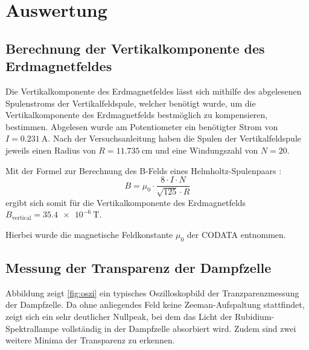 \section{Auswertung}
\label{sec:Auswertung}
\subsection{Berechnung der Vertikalkomponente des Erdmagnetfeldes}
Die Vertikalkomponente des Erdmagnetfeldes lässt sich mithilfe des abgelesenen Spulenstroms der Vertikalfeldspule, welcher benötigt wurde, um die Vertikalkomponente des Erdmagnetfelds bestmöglich zu kompensieren, bestimmen.
Abgelesen wurde am Potentiometer ein benötigter Strom von $I=\SI{0.231}{\ampere}$.
Nach der Versuchsanleitung \cite{Anleitung} haben die Spulen der Vertikalfeldspule jeweils einen Radius von $R=\SI{11.735}{\centi\meter}$ und eine Windungszahl von $N=20$.

Mit der Formel zur Berechnung des B-Felds eines Helmholtz-Spulenpaars \cite{demtröder}:
\begin{equation}
\label{eqn:hholtz}
B=\mu_{\mathrm{0}} \cdot \frac{8\cdot I \cdot N}{\sqrt{125}\cdot R}
\end{equation}
ergibt sich somit für die Vertikalkomponente des Erdmagnetfelds $B_{\mathrm{vertical}}=\SI{35.4e-6}{\tesla}$.

Hierbei wurde die magnetische Feldkonstante $\mu_{0}$ der CODATA entnommen. \cite{mu_0}
\subsection{Messung der Transparenz der Dampfzelle}
Abbildung zeigt \ref{fig:oszi} ein typisches Oszilloskopbild der Tranzparenzmessung der Dampfzelle.
Da ohne anliegendes Feld keine Zeeman-Aufspaltung stattfindet, zeigt sich ein sehr deutlicher Nullpeak, bei dem das Licht der Rubidium-Spektrallampe vollständig in der Dampfzelle absorbiert wird. Zudem sind zwei weitere Minima der Transparenz zu erkennen.

